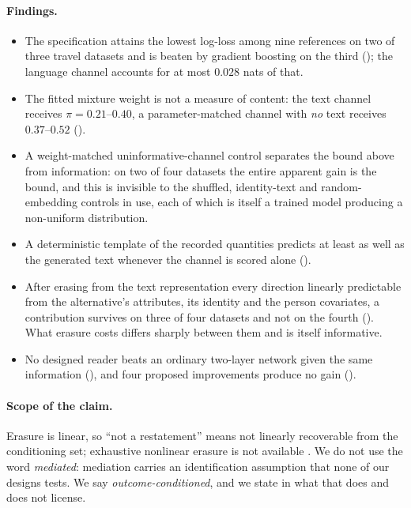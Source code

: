 \paragraph{Findings.}
\begin{itemize}
\item The specification attains the lowest log-loss among nine references on two of three
      travel datasets and is beaten by gradient boosting on the third
      (); the language channel accounts for at most $0.028$ nats of that.
\item The fitted mixture weight is not a measure of content: the text channel receives
      $\pi = 0.21$--$0.40$, a parameter-matched channel with \emph{no} text receives
      $0.37$--$0.52$ ().
\item A weight-matched uninformative-channel control separates the bound above from
      information: on two of four datasets the entire apparent gain is the bound, and this is
      invisible to the shuffled, identity-text and random-embedding controls in use, each of
      which is itself a trained model producing a non-uniform distribution.
\item A deterministic template of the recorded quantities predicts at least as well as the
      generated text whenever the channel is scored alone ().
\item After erasing from the text representation every direction linearly predictable from
      the alternative's attributes, its identity and the person covariates, a contribution
      survives on three of four datasets and not on the fourth
      (). What erasure costs differs sharply between them and is
      itself informative.
\item No designed reader beats an ordinary two-layer network given the same information
      (), and four proposed improvements produce no gain
      ().
\end{itemize}

\paragraph{Scope of the claim.} Erasure is linear, so ``not a restatement'' means not
linearly recoverable from the conditioning set; exhaustive nonlinear erasure is not available
\citep{ravfogel2022kernelized}. We do not use the word \emph{mediated}: mediation carries an
identification assumption \citep{imai2010general} that none of our designs tests. We say
\emph{outcome-conditioned}, and we state in  what that does and does not
license.
